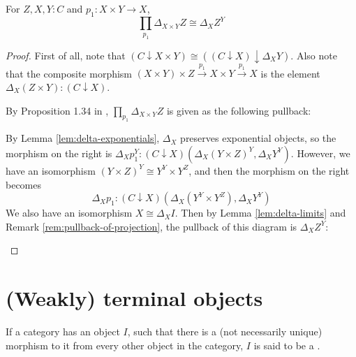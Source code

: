 \begin{lemma}\label{lem:constant-dependent-product}
  For $ Z, X, Y : C $ and $ p_1 : X \times Y \to X $,
  \[ \prod_{p_1} \Delta_{X \times Y} Z \cong \Delta_X Z^Y \]
\end{lemma}
\begin{proof}
  First of all, note that $ (C \downarrow X \times Y) \cong ((C \downarrow X) \downarrow \Delta_X Y) $. Also note that the composite morphism $ (X \times Y) \times Z \xrightarrow{p_1} X \times Y \xrightarrow{p_1} X $ is the element $ \Delta_X (Z \times Y) : (C \downarrow X) $.

  By Proposition 1.34 in \autocite{freyd}, $ \prod_{p_1} \Delta_{X \times Y} Z $ is given as the following pullback:
  \begin{center}
  \end{center}

  By Lemma \ref{lem:delta-exponentials}, $ \Delta_X $ preserves exponential objects, so the morphism on the right is $ \Delta_X p_1^Y : (C \downarrow X)(\Delta_X (Y \times Z)^Y, \Delta_X Y^Y) $. However, we have an isomorphism $ (Y \times Z)^Y \cong Y^Y \times Y^Z $, and then the morphism on the right becomes
  \[ \Delta_X p_1 : (C \downarrow X)(\Delta_X(Y^Y \times Y^Z), \Delta_X Y^Y) \]
  We also have an isomorphism $ X \cong \Delta_X I $. Then by Lemma \ref{lem:delta-limits} and Remark \ref{rem:pullback-of-projection}, the pullback of this diagram is $ \Delta_X Z^Y $:
  \begin{center}
  \end{center}
\end{proof}


\section{(Weakly) terminal objects}
\begin{definition}
  If a category has an object $ I $, such that there is a (not necessarily unique) morphism to it from every other object in the category, $ I $ is said to be a .
\end{definition}

